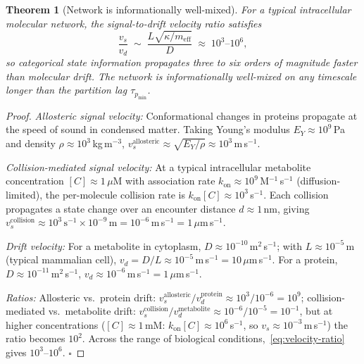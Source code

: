 \documentclass[twocolumn,10pt,a4paper]{article}
\newcommand{\taup}{\tau_p}
\newtheorem{theorem}{Theorem}[section]
\begin{document}
\begin{theorem}[Network is informationally well-mixed]
\label{thm:well-mixed}
For a typical intracellular molecular network, the signal-to-drift velocity
ratio satisfies
\begin{equation}
  \frac{v_s}{v_d} \;\sim\; \frac{L\sqrt{\kappa/m_{\mathrm{eff}}}}{D}
    \;\approx\; 10^3\text{--}10^6,
  \label{eq:velocity-ratio}
\end{equation}
so categorical state information propagates three to six orders of magnitude
faster than molecular drift.  The network is informationally well-mixed on
any timescale longer than the partition lag $\taup_{\min}$.
\end{theorem}

\begin{proof}
\emph{Allosteric signal velocity:}  Conformational changes in proteins
propagate at the speed of sound in condensed matter.  Taking Young's modulus
$E_Y\approx 10^9$\,Pa and density $\rho\approx 10^3$\,kg\,m$^{-3}$,
$v_s^{\mathrm{allosteric}}\approx\sqrt{E_Y/\rho}\approx 10^3$\,m\,s$^{-1}$.

\emph{Collision-mediated signal velocity:}  At a typical intracellular
metabolite concentration $[C]\approx 1\,\mu$M with association rate
$k_{\mathrm{on}}\approx 10^9$\,M$^{-1}$\,s$^{-1}$ (diffusion-limited), the
per-molecule collision rate is $k_{\mathrm{on}}[C]\approx 10^3$\,s$^{-1}$.
Each collision propagates a state change over an encounter distance
$d\approx 1$\,nm, giving $v_s^{\mathrm{collision}}\approx
10^3\,\mathrm{s}^{-1}\times 10^{-9}\,\mathrm{m}=10^{-6}$\,m\,s$^{-1}=
1\,\mu$m\,s$^{-1}$.

\emph{Drift velocity:}  For a metabolite in cytoplasm,
$D\approx 10^{-10}$\,m$^2$\,s$^{-1}$; with $L\approx 10^{-5}$\,m
(typical mammalian cell), $v_d=D/L\approx 10^{-5}$\,m\,s$^{-1}=10\,\mu$m\,s$^{-1}$.
For a protein, $D\approx 10^{-11}$\,m$^2$\,s$^{-1}$,
$v_d\approx 10^{-6}$\,m\,s$^{-1}=1\,\mu$m\,s$^{-1}$.

\emph{Ratios:}  Allosteric vs.\ protein drift:
$v_s^{\mathrm{allosteric}}/v_d^{\mathrm{protein}}\approx 10^3/10^{-6}=10^9$;
collision-mediated vs.\ metabolite drift:
$v_s^{\mathrm{collision}}/v_d^{\mathrm{metabolite}}\approx
10^{-6}/10^{-5}=10^{-1}$, but at higher concentrations
($[C]\approx 1$\,mM: $k_{\mathrm{on}}[C]\approx 10^6$\,s$^{-1}$, so
$v_s\approx 10^{-3}$\,m\,s$^{-1}$) the ratio becomes $10^2$.
Across the range of biological conditions,~\eqref{eq:velocity-ratio}
gives $10^3$--$10^6$.  $\square$
\end{proof}
\end{document}
